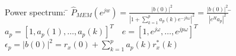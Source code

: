 \begin{tabbing}
Power spectrum:  	\=  $\hat{P}_{MEM}(e^{jw}) =  \frac{|b(0)|^2}{\left| 1 + \sum\limits_{k=1}^{p} a_p(k)e^{-jk\omega}\right|^2} = 				
						\frac{|b(0)|^2}{\left|e^H a_p\right|^2}$ 
						\hspace{1cm} \= $a_p=[1,a_p(1),\ldots, a_p(k)]^T \quad e=[1,e^{j\omega},\ldots, e^{jp\omega}]^T $ \\
\>						$\epsilon_p = |b(0)|^2 = r_x(0) + \sum\limits_{k=1}^p a_p(k) r_x^*(k)$ \\
\end{tabbing}

